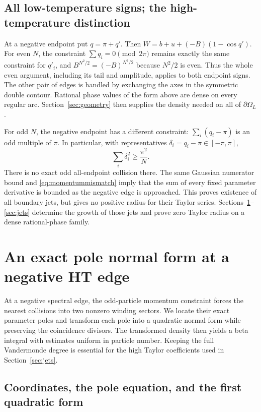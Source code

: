 \documentclass[11pt]{article}
\numberwithin{equation}{section}
\theoremstyle{definition}
\newcommand{\OL}{\Omega_L}
\begin{document}
\subsection{All low-temperature signs; the high-temperature distinction}
At a negative endpoint put $q=\pi+q'$. Then
$W=b+u+(-B)(1-\cos q')$. For even $N$, the constraint
$\sum q_i=0\pmod{2\pi}$ remains exactly the same constraint for
$q'_i$, and $B^{N^2/2}=(-B)^{N^2/2}$ because $N^2/2$ is even.
Thus the whole even argument, including its tail and amplitude, applies
to both endpoint signs. The other pair of edges is handled by exchanging
the axes in the symmetric double contour. Rational phase values of the
form above are dense on every regular arc. Section~\ref{sec:geometry}
then supplies the density needed on all of $\partial\OL$.

For odd $N$, the negative endpoint has a different constraint:
$\sum_i(q_i-\pi)$ is an odd multiple of $\pi$. In particular, with
representatives $\delta_i=q_i-\pi\in[-\pi,\pi]$,
\begin{equation}\label{eq:momentummismatch}
 \sum_i\delta_i^2\ge\frac{\pi^2}{N}.
\end{equation}
There is no exact odd all-endpoint collision there. The same Gaussian
numerator bound and \eqref{eq:momentummismatch} imply that the sum of
every fixed parameter derivative is bounded as the negative edge is
approached. This proves existence of all boundary jets, but gives no
positive radius for their Taylor series. Sections~\ref{sec:morse}--\ref{sec:jets} determine the growth of those
jets and prove zero Taylor radius on a dense rational-phase family.



\section{An exact pole normal form at a negative HT edge}
\label{sec:morse}

At a negative spectral edge, the odd-particle momentum constraint
forces the nearest collisions into two nonzero winding sectors.
We locate their exact parameter poles and transform each pole into
a quadratic normal form while preserving the coincidence divisors.
The transformed density then yields a beta integral with estimates
uniform in particle number. Keeping the full Vandermonde degree is
essential for the high Taylor coefficients used in Section~\ref{sec:jets}.

\subsection{Coordinates, the pole equation, and the first quadratic form}
\end{document}
